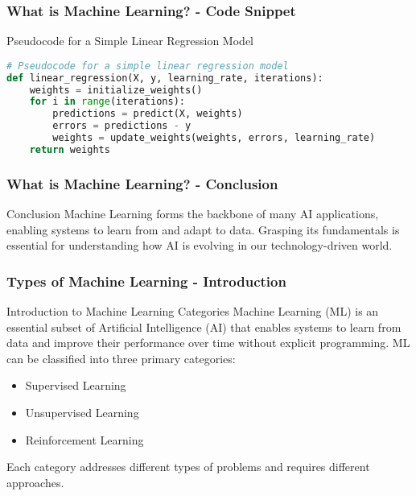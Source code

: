 \documentclass[aspectratio=169]{beamer}
\begin{document}
\begin{frame}[fragile]
    \frametitle{What is Machine Learning? - Code Snippet}
    \begin{block}{Pseudocode for a Simple Linear Regression Model}
    \begin{lstlisting}[language=Python]
# Pseudocode for a simple linear regression model
def linear_regression(X, y, learning_rate, iterations):
    weights = initialize_weights()
    for i in range(iterations):
        predictions = predict(X, weights)
        errors = predictions - y
        weights = update_weights(weights, errors, learning_rate)
    return weights
    \end{lstlisting}
    \end{block}
\end{frame}

\begin{frame}[fragile]
    \frametitle{What is Machine Learning? - Conclusion}
    \begin{block}{Conclusion}
        Machine Learning forms the backbone of many AI applications, enabling systems to learn from and adapt to data. Grasping its fundamentals is essential for understanding how AI is evolving in our technology-driven world.
    \end{block}
\end{frame}

\begin{frame}[fragile]
    \frametitle{Types of Machine Learning - Introduction}
    \begin{block}{Introduction to Machine Learning Categories}
        Machine Learning (ML) is an essential subset of Artificial Intelligence (AI) that enables systems to learn from data and improve their performance over time without explicit programming. ML can be classified into three primary categories:
    \end{block}
    \begin{itemize}
        \item Supervised Learning
        \item Unsupervised Learning
        \item Reinforcement Learning
    \end{itemize}
    Each category addresses different types of problems and requires different approaches.
\end{frame}
\end{document}
